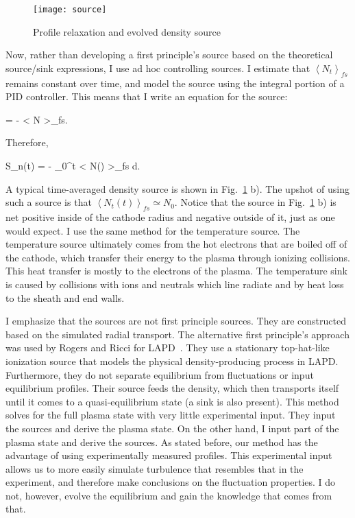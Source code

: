 \begin{figure}[!ht]
\centerline{\texttt{[image: source]}}
\caption{Profile relaxation and evolved density source}
\label{source}
\end{figure}


Now, rather than developing a first principle's source based on the theoretical source/sink expressions, I use ad hoc controlling sources. 
I estimate that $\left< N_t \right>_{fs}$ remains constant over time, and model the source using the integral
portion of a PID controller. This means that I write an equation for the source:

\beq
\label{Sn_eq}
 = - \left< N \right>_{fs}.
\eeq

Therefore,

\beq
\label{Sn_eq2}
S_n(t) = - \int_0^t \left< N(\tau) \right>_{fs} d\tau.
\eeq

A typical time-averaged density source is shown in Fig.~\ref{source} b).
The upshot of using such a source is that $\left< N_t(t) \right>_{fs} \simeq N_0$. Notice that the source in Fig.~\ref{source} b) is net positive inside of the cathode radius and negative
outside of it, just as one would expect.
I use the same method for the temperature source. The temperature source ultimately comes from the hot electrons that are boiled off of
the cathode, which transfer their energy to the plasma through ionizing collisions. This heat transfer is mostly to the electrons of the plasma. The temperature sink is caused by collisions
with ions and neutrals which line radiate and by heat loss to the sheath and end walls.

I emphasize that the sources are not first principle sources. They are constructed based on the simulated radial transport. The alternative first principle's approach was used by Rogers and Ricci
for LAPD~\cite{rogers2010}. They use a stationary top-hat-like ionization source that models the physical density-producing process in LAPD. 
Furthermore, they do not separate equilibrium from fluctuations or input equilibrium profiles. Their source feeds the density, which then transports itself until it comes to a quasi-equilibrium state
(a sink is also present). This method solves for the full plasma state with very little experimental input. 
They input the sources and derive the plasma state. On the other hand, I input part of the plasma
state and derive the sources. As stated before, our method has the advantage of using experimentally measured profiles. 
This experimental input allows us to more easily simulate turbulence that resembles that
in the experiment, and therefore make conclusions on the fluctuation properties. I do not, however, evolve the equilibrium and gain the knowledge that comes from that.

